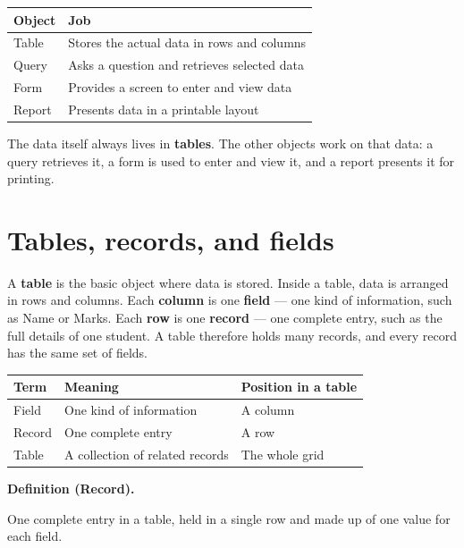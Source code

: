 \documentclass[11pt]{article}
\newenvironment{definitionbox}[1]{%
  \par\noindent\textbf{Definition (#1).}\ \itshape
}{\par\vspace{0.3em}}
\begin{document}
\begin{center}
\begin{tabular}{p{}p{}}
\toprule
\textbf{Object} & \textbf{Job} \\
\midrule
Table & Stores the actual data in rows and columns \\
Query & Asks a question and retrieves selected data \\
Form & Provides a screen to enter and view data \\
Report & Presents data in a printable layout \\
\bottomrule
\end{tabular}
\end{center}

The data itself always lives in \textbf{tables}. The other objects work on
that data: a query retrieves it, a form is used to enter and view it, and a
report presents it for printing.

\section{Tables, records, and fields}
A \textbf{table} is the basic object where data is stored. Inside a table,
data is arranged in rows and columns. Each \textbf{column} is one
\textbf{field} --- one kind of information, such as Name or Marks. Each
\textbf{row} is one \textbf{record} --- one complete entry, such as the full
details of one student. A table therefore holds many records, and every
record has the same set of fields.

\begin{center}
\begin{tabular}{p{}p{}p{}}
\toprule
\textbf{Term} & \textbf{Meaning} & \textbf{Position in a table} \\
\midrule
Field & One kind of information & A column \\
Record & One complete entry & A row \\
Table & A collection of related records & The whole grid \\
\bottomrule
\end{tabular}
\end{center}

\begin{definitionbox}{Record}
One complete entry in a table, held in a single row and made up of one value
for each field.
\end{definitionbox}
\end{document}
